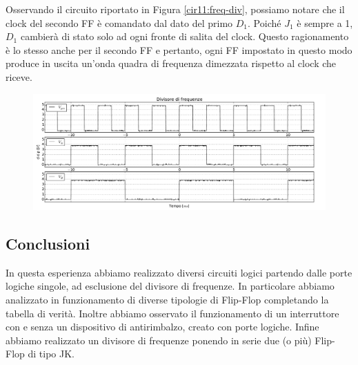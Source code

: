 Osservando il circuito riportato in Figura \ref{cir11:freq-div}, possiamo notare che il clock del secondo FF è comandato dal dato del primo $D_1$.
Poiché $J_1$ è sempre a 1, $D_1$ cambierà di stato solo ad ogni fronte di salita del clock.
Questo ragionamento è lo stesso anche per il secondo FF e pertanto, ogni FF impostato in questo modo produce in uscita un'onda quadra di frequenza dimezzata rispetto al clock che riceve.

\begin{figure}[htpc]
\centering
	\includegraphics[width=.98\textwidth]{../E11/latex/gfreq.pdf}
	\caption{}
	\label{gr11:freq}
\end{figure}

\subsection*{Conclusioni}

In questa esperienza abbiamo realizzato diversi circuiti logici partendo dalle porte logiche singole, ad esclusione del divisore di frequenze.
In particolare abbiamo analizzato in funzionamento di diverse tipologie di Flip-Flop completando la tabella di verità.
Inoltre abbiamo osservato il funzionamento di un interruttore con e senza un dispositivo di antirimbalzo, creato con porte logiche.
Infine abbiamo realizzato un divisore di frequenze ponendo in serie due (o più) Flip-Flop di tipo JK.

